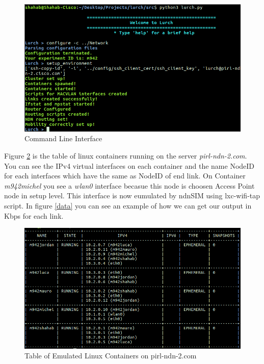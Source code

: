 \begin{figure}[H]

\begin{center}

\includegraphics[scale = 0.35]{Pictures/lurch.png}

\caption{Command Line Interface} \label{cli} 

\end{center}

\end{figure}

 
Figure \ref{table} is the table of linux containers running on the server \textit{pirl-ndn-2.com}. You can see the IPv4 virtual interfaces on each container and the name NodeID for each interfaces which have the same as NodeID of end link. On Container \textit{m942michel} you see a \textit{wlan0} interface becasue this node is choosen Access Point node in setup level. This interface is now eumulated by ndnSIM using lxc-wifi-tap script. In figure \ref{data} you can see an example of how we can get our output in Kbps for each link.


\begin{figure}[H]

\begin{center}

\includegraphics[scale = 0.3]{Pictures/table.png}

\caption{Table of Emulated Linux Containers on pirl-ndn-2.com} \label{table} 

\end{center}

\end{figure}


